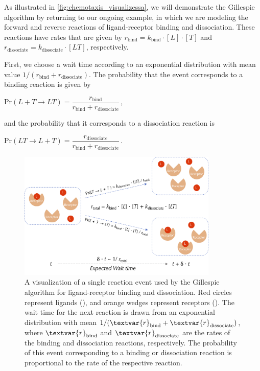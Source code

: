 \begin{qbox}\end{qbox}

As illustrated in \autoref{fig:chemotaxis_visualizessa}, we will demonstrate the Gillespie algorithm by returning to our ongoing example, in which we are modeling the forward and reverse reactions of ligand-receptor binding and dissociation. These reactions have rates that are given by $r_\text{bind} = k_\text{bind} \cdot [L] \cdot [T]$ and $r_\text{dissociate} = k_\text{dissociate} \cdot [LT]$, respectively.

First, we choose a wait time according to an exponential distribution with mean value $1/(r_\text{bind} + r_\text{dissociate})$. The probability that the event corresponds to a binding reaction is given by

\begin{center}
$\mathrm{Pr}(L + T \rightarrow LT) = \dfrac{r_\text{bind}}{r_\text{bind} + r_\text{dissociate}}$\,,
\end{center}

\noindent and the probability that it corresponds to a dissociation reaction is

\begin{center}
$\mathrm{Pr}(LT \rightarrow L + T) = \dfrac{r_\text{dissociate}}{r_\text{bind} + r_\text{dissociate}}$\,.
\end{center}

\begin{figure}[h]
\centering
\mySfFamily
\includegraphics[width = 0.85\textwidth]{../images/chemotaxis_visualizessa.png}
\caption{A visualization of a single reaction event used by the Gillespie algorithm for ligand-receptor binding and dissociation. Red circles represent ligands (), and orange wedges represent receptors (). The wait time for the next reaction is drawn from an exponential distribution with mean $\text{1}/(\textvar{r}_\text{bind} + \textvar{r}_\text{dissociate})$, where $\textvar{r}_\text{bind}$ and $\textvar{r}_\text{dissociate}$ are the rates of the binding and dissociation reactions, respectively. The probability of this event corresponding to a binding or dissociation reaction is proportional to the rate of the respective reaction.}
\label{fig:chemotaxis_visualizessa}
\end{figure}

